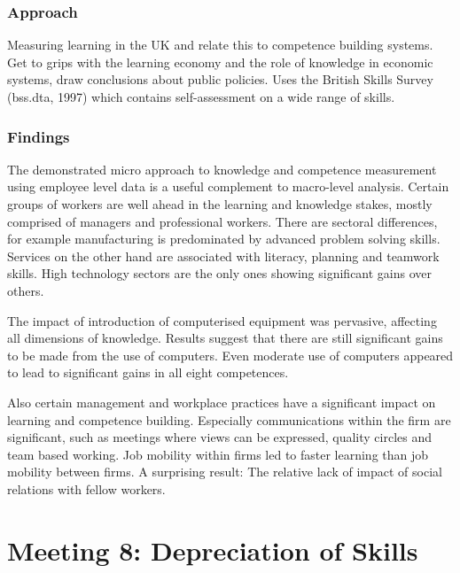 \documentclass[12pt,a4paper]{article}
\begin{document}
      \subsubsection{Approach}
        Measuring learning in the UK and relate this to competence building systems. Get to grips with the learning economy and the role of knowledge in economic systems, draw conclusions about public policies. Uses the British Skills Survey (bss.dta, 1997) which contains self-assessment on a wide range of skills.

      \subsubsection{Findings}
        The demonstrated micro approach to knowledge and competence measurement using employee level data is a useful complement to macro-level analysis. Certain groups of workers are well ahead in the learning and knowledge stakes, mostly comprised of managers and professional workers. There are sectoral differences, for example manufacturing is predominated by advanced problem solving skills. Services on the other hand are associated with literacy, planning and teamwork skills. High technology sectors are the only ones showing significant gains over others.

        The impact of introduction of computerised equipment was pervasive, affecting all dimensions of knowledge. Results suggest that there are still significant gains to be made from the use of computers. Even moderate use of computers appeared to lead to significant gains in all eight competences.

        Also certain management and workplace practices have a significant impact on learning and competence building. Especially communications within the firm are significant, such as meetings where views can be expressed, quality circles and team based working. Job mobility within firms led to faster learning than job mobility between firms. A surprising result: The relative lack of impact of social relations with fellow workers.


  \section{Meeting 8: Depreciation of Skills} %
  \label{sec:Meeting 8}
\end{document}
